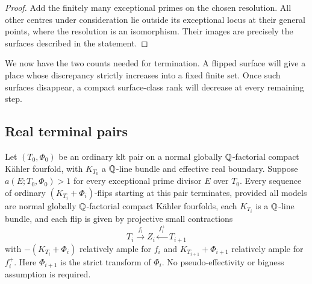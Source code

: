 \begin{proof}
Add the finitely many exceptional primes on the chosen resolution.
All other centres under consideration lie outside its exceptional locus
at their general points, where the resolution is an isomorphism.  Their
images are precisely the surfaces described in the statement.
\end{proof}

We now have the two counts needed for termination.  A flipped surface
will give a place whose discrepancy strictly increases into a fixed
finite set.  Once such surfaces disappear, a compact surface-class rank
will decrease at every remaining step.

\subsection{Real terminal pairs}

\begin{proposition}\label{prop:terminal-real-four}
Let $(T_0,\Phi_0)$ be an ordinary klt pair on a normal globally
$\mathbb Q$-factorial compact K\"ahler fourfold, with $K_{T_0}$ a
$\mathbb Q$-line bundle and effective real boundary.  Suppose
$a(E;T_0,\Phi_0)>1$ for every exceptional prime divisor $E$ over $T_0$.
Every sequence of ordinary $(K_{T_i}+\Phi_i)$-flips starting at this
pair terminates, provided all models are normal globally $\mathbb Q$-factorial
compact K\"ahler fourfolds, each $K_{T_i}$ is a $\mathbb Q$-line bundle, and
each flip is given by projective small contractions
\[
 T_i\xrightarrow{\ f_i\ }Z_i
 \xleftarrow{\ f_i^+\ }T_{i+1}
\]
with $-(K_{T_i}+\Phi_i)$ relatively ample for $f_i$ and
$K_{T_{i+1}}+\Phi_{i+1}$ relatively ample for $f_i^+$.
Here $\Phi_{i+1}$ is the strict transform of $\Phi_i$.
No pseudo-effectivity or bigness assumption is required.
\end{proposition}

